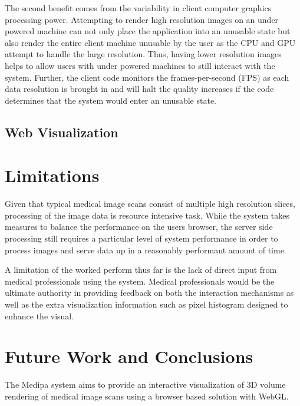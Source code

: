 \documentclass{acm_proc_article-sp}
\begin{document}
The second benefit comes from the variability in client computer graphics processing power.  Attempting to render high resolution images on an under powered machine can not only place the application into an unusable state but also render the entire client machine unusable by the user as the CPU and GPU attempt to handle the large resolution.  Thus, having lower resolution images helps to allow users with under powered machines to still interact with the system.  Further, the client code monitors the frames-per-second (FPS) as each data resolution is brought in and will halt the quality increases if the code determines that the system would enter an unusable state.


\subsection{Web Visualization}

\section{Limitations}
Given that typical medical image scans consist of multiple high resolution slices, processing of the image data is resource intensive task.  While the system takes measures to balance the performance on the users browser, the server side processing still requires a particular level of system performance in order to process images and serve data up in a reasonably performant amount of time.

A limitation of the worked perform thus far is the lack of direct input from medical professionals using the system.  Medical professionals would be the ultimate authority in providing feedback on both the interaction mechanisms as well as the extra visualization information such as pixel histogram designed to enhance the visual.		

\section{Future Work and Conclusions}
The Medipa system aims to provide an interactive visualization of 3D volume rendering of medical image scans using a browser based solution with WebGL.

%

%
%
\appendix
\section{}


\balancecolumns
\end{document}
